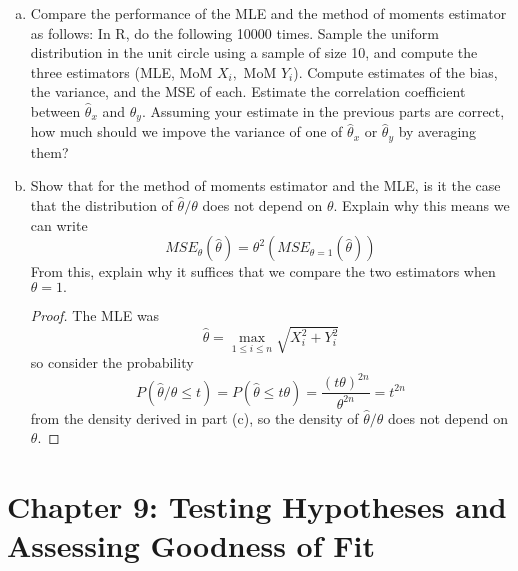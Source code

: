 \documentclass{article}
\begin{document}
\begin{enumerate}
\begin{enumerate}[(a)]
			\item Compare the performance of the MLE and the method of moments estimator as follows: In R, do the following 10000 times. Sample the uniform distribution in the unit circle using a sample of size 10, and compute the three estimators (MLE, MoM $X_i,$ MoM $Y_i$). Compute estimates of the bias, the variance, and the MSE of each. Estimate the correlation coefficient between $\hat{\theta}_x$ and $\hat{\theta}_y.$ Assuming your estimate in the previous parts are correct, how much should we impove the variance of one of $\hat{\theta}_x$ or $\hat{\theta}_y$ by averaging them?

			\item Show that for the method of moments estimator and the MLE, is it the case that the distribution of $\hat{\theta}/\theta$ does not depend on $\theta.$ Explain why this means we can write \[MSE_\theta(\hat{\theta})=\theta^2\left( MSE_{\theta=1}(\hat{\theta}) \right)\] From this, explain why it suffices that we compare the two estimators when $\theta=1.$
				\begin{proof}
					The MLE was \[\hat{\theta}=\max_{1\le i\le n}\sqrt{X_i^2+Y_i^2}\] so consider the probability \[P(\hat{\theta}/\theta \le t) = P(\hat{\theta}\le t\theta) = \frac{(t\theta)^{2n}}{\theta^{2n}} = t^{2n}\] from the density derived in part (c), so the density of $\hat{\theta}/\theta$ does not depend on $\theta.$ 
				\end{proof}
				
		\end{enumerate}
		
\end{enumerate}
\newpage
\section*{Chapter 9: Testing Hypotheses and Assessing Goodness of Fit}
\end{document}
